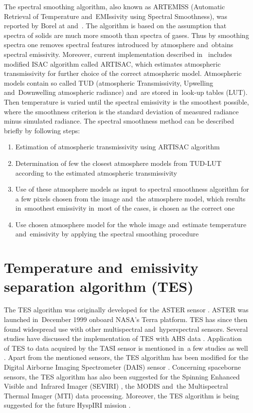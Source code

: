 The spectral smoothing algorithm, also known as ARTEMISS (Automatic Retrieval of Temperature and~EMIssivity using Spectral Smoothness), was reported by Borel at \cite{B98} and~\cite{B08}. The algorithm is based on the assumption that spectra of solids are much more smooth than spectra of gases. Thus by smoothing spectra one removes spectral features introduced by atmosphere and~obtains spectral emissivity. Moreover, current implementation described in~\cite{B08} includes modified ISAC algorithm called ARTISAC, which estimates atmospheric transmissivity for further choice of the correct atmospheric model. Atmospheric models contain so called TUD (atmospheric Transmissivity, Upwelling and~Downwelling atmospheric radiance) and~are stored in~look-up tables (LUT). Then temperature is varied until the spectral emissivity is the smoothest possible, where the smoothness criterion is the standard deviation of measured radiance minus simulated radiance. The spectral smoothness method can be described briefly by following steps:
\begin{enumerate}
	\item Estimation of atmospheric transmissivity using ARTISAC algorithm
	\item Determination of few the closest atmosphere models from TUD-LUT according to the estimated atmospheric transmissivity
	\item Use of these atmosphere models as input to spectral smoothness algorithm for a few pixels chosen from the image and~the atmosphere model, which results in~smoothest emissivity in~most of the cases, is chosen as the correct one
	\item Use chosen atmosphere model for the whole image and~estimate temperature and~emissivity by applying the spectral smoothing procedure
\end{enumerate}

\section{Temperature and~emissivity separation algorithm (TES)}
\label{sec:TES}

The TES algorithm was originally developed for the ASTER sensor \cite{GR98}. ASTER was launched in~December 1999 onboard NASA's Terra platform. TES has since then found widespread use with other multispectral and~hyperspectral sensors. Several studies have discussed the implementation of TES with AHS data \cite{SJ06, JS12}. Application of TES to data acquired by the TASI sensor is mentioned in~a few studies as well \cite{WX11, PP12}. Apart from the mentioned sensors, the TES algorithm has been modified for the Digital Airborne Imaging Spectrometer (DAIS) sensor \cite{SJ02}. Concerning spaceborne sensors, the TES algorithm has also been suggested for the Spinning Enhanced Visible and~Infrared Imager (SEVIRI) \cite{JS14}, the MODIS \cite{HH11} and~the Multispectral Thermal Imager (MTI) \cite{MB02} data processing. Moreover, the TES algorithm is being suggested for the future HyspIRI mission \cite{HH11-2}.

